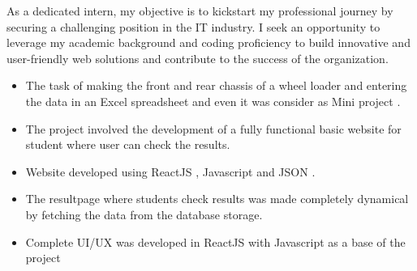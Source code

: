 \documentclass[10pt,a4paper,ragged2e]{altacv}
\begin{document}

\begin{fullwidth}
\makecvheader
\end{fullwidth}


\item As a dedicated intern, my objective is to kickstart my professional journey by securing a challenging position in the IT industry. I seek an opportunity to leverage my academic background and coding proficiency to build innovative and user-friendly web solutions and contribute to the success of the organization.
 


\begin{itemize}
\item  The task of making the front and rear chassis of a wheel loader and entering the data in an Excel spreadsheet and even it was consider as Mini project .
\end{itemize}

\divider

\begin{itemize}
\item  The project involved the development of a fully functional basic website for student where user can check the results.
\item Website developed using ReactJS , Javascript and JSON .
\item  The resultpage where students check results was made completely dynamical by fetching the data from the database storage.
\item Complete UI/UX was developed in ReactJS with Javascript as a base of the project
\end{itemize}
\divider
\end{document}
